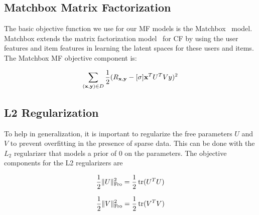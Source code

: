 \subsection{Matchbox Matrix Factorization}

The basic objective function we use for our MF models is the Matchbox~\cite{matchbox} model. Matchbox extends the matrix factorization model~\cite{pmf}  for CF by using the user features and item features in learning the latent spaces for these users and items. The Matchbox MF objective component is:

\begin{align}
\sum_{(\mathbf{x},\mathbf{y}) \in D} \frac{1}{2} (R_{\mathbf{x},\mathbf{y}} - [\sigma] \mathbf{x}^T U^T V y)^2
\end{align}

\subsection{L2 Regularization}

To help in generalization, it is important to regularize the free parameters $U$ and $V$ to prevent overfitting in
the presence of sparse data. This can be done with the
$L_2$ regularizer that models a prior of $0$ on the parameters. The objective components for the L2 regularizers are

\begin{align}
\frac{1}{2} \| U \|_{\mathrm{Fro}}^2 = \frac{1}{2} \operatorname{tr}(U^T U)
\end{align}

\begin{align}
\frac{1}{2} \| V \|_{\mathrm{Fro}}^2 = \frac{1}{2} \operatorname{tr}(V^T V)
\end{align}

